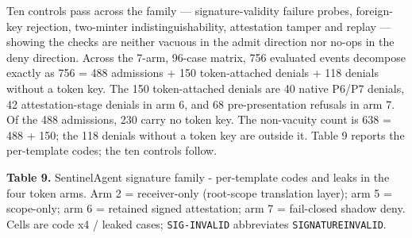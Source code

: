 \documentclass[
  10pt,
]{article}
\let\origtexttt\texttt
\renewcommand{\texttt}[1]{{\upshape\origtexttt{#1}}}
\renewcommand{\_}{\allowbreak\origunderscore}
\begin{document}
Ten controls pass across the family --- signature-validity failure
probes, foreign-key rejection, two-minter indistinguishability,
attestation tamper and replay --- showing the checks are neither vacuous
in the admit direction nor no-ops in the deny direction. Across the
7-arm, 96-case matrix, 756 evaluated events decompose exactly as 756 =
488 admissions + 150 token-attached denials + 118 denials without a
token key. The 150 token-attached denials are 40 native P6/P7 denials,
42 attestation-stage denials in arm 6, and 68 pre-presentation refusals
in arm 7. Of the 488 admissions, 230 carry no token key. The non-vacuity
count is 638 = 488 + 150; the 118 denials without a token key are
outside it. Table 9 reports the per-template codes; the ten controls
follow.

\textbf{Table 9.} SentinelAgent signature family - per-template codes
and leaks in the four token arms. Arm 2 = receiver-only (root-scope
translation layer); arm 5 = scope-only; arm 6 = retained signed
attestation; arm 7 = fail-closed shadow deny. Cells are code x4 / leaked
cases; \texttt{SIG-INVALID} abbreviates \texttt{SIGNATURE\_INVALID}.
\end{document}
